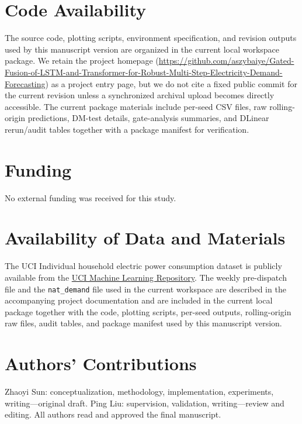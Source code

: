 \documentclass[pdflatex,sn-mathphys-num]{sn-jnl}
\theoremstyle{thmstyleone}
\theoremstyle{thmstyletwo}
\theoremstyle{thmstylethree}
\begin{document}
\section*{Code Availability}

The source code, plotting scripts, environment specification, and revision outputs used by this manuscript version are organized in the current local workspace package. We retain the project homepage (\url{https://github.com/aszybaiye/Gated-Fusion-of-LSTM-and-Transformer-for-Robust-Multi-Step-Electricity-Demand-Forecasting}) as a project entry page, but we do not cite a fixed public commit for the current revision unless a synchronized archival upload becomes directly accessible. The current package materials include per-seed CSV files, raw rolling-origin predictions, DM-test details, gate-analysis summaries, and DLinear rerun/audit tables together with a package manifest for verification.

\section*{Funding}

No external funding was received for this study.

\section*{Availability of Data and Materials}

The UCI Individual household electric power consumption dataset is publicly available from the \href{https://archive.ics.uci.edu/ml/datasets/Individual+household+electric+power+consumption}{UCI Machine Learning Repository}. The weekly pre-dispatch file and the \texttt{nat\_demand} file used in the current workspace are described in the accompanying project documentation and are included in the current local package together with the code, plotting scripts, per-seed outputs, rolling-origin raw files, audit tables, and package manifest used by this manuscript version.

\section*{Authors' Contributions}

Zhaoyi Sun: conceptualization, methodology, implementation, experiments, writing---original draft. Ping Liu: supervision, validation, writing---review and editing. All authors read and approved the final manuscript.
\end{document}
